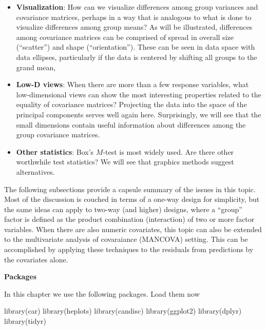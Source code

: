 \documentclass[
  letterpaper,
  10pt,
  krantz2]{krantz}
\makeatletter
\newenvironment{Shaded}{\begin{snugshade}}{\end{snugshade}}
\newcommand{\FunctionTok}[1]{\textcolor[rgb]{0.28,0.35,0.67}{#1}}
\newcommand{\NormalTok}[1]{\textcolor[rgb]{0.00,0.23,0.31}{#1}}
\newenvironment{kframe}{%
  \medskip{}
  \setlength{\fboxsep}{.8em}
  \def\at@end@of@kframe{}%
  \ifinner\ifhmode%
  \def\at@end@of@kframe{\end{minipage}}%
  \begin{minipage}{\columnwidth}%
  \fi\fi%
  \def\FrameCommand##1{\hskip\@totalleftmargin \hskip-\fboxsep
  \colorbox{shadecolor}{##1}\hskip-\fboxsep
      \hskip-\linewidth \hskip-\@totalleftmargin \hskip\columnwidth}%
  \MakeFramed {\advance\hsize-\width
    \@totalleftmargin\z@ \linewidth\hsize
    \@setminipage}}%
{\par\unskip\endMakeFramed%
  \at@end@of@kframe}
\renewenvironment{Shaded}{\begin{kframe}}{\end{kframe}}
\makeatother
\begin{document}
\begin{itemize}
\item
  \textbf{Visualization}: How can we visualize differences among group
  variances and covariance matrices, perhaps in a way that is analogous
  to what is done to visualize differences among group means? As will be
  illustrated, differences among covariance matrices can be comprised of
  spread in overall size (``scatter'') and shape (``orientation'').
  These can be seen in data space with data ellipses, particularly if
  the data is centered by shifting all groups to the grand mean,
\item
  \textbf{Low-D views}: When there are more than a few response
  variables, what low-dimensional views can show the most interesting
  properties related to the equality of covariance matrices? Projecting
  the data into the space of the principal components serves well again
  here. Surprisingly, we will see that the small dimensions contain
  useful information about differences among the group covariance
  matrices.
\item
  \textbf{Other statistics}: Box's \(M\)-test is most widely used. Are
  there other worthwhile test statistics? We will see that graphics
  methods suggest alternatives.
\end{itemize}

The following subsections provide a capsule summary of the issues in
this topic. Most of the discussion is couched in terms of a one-way
design for simplicity, but the same ideas can apply to two-way (and
higher) designs, where a ``group'' factor is defined as the product
combination (interaction) of two or more factor variables. When there
are also numeric covariates, this topic can also be extended to the
multivariate analysis of covaraiance (MANCOVA) setting. This can be
accomplished by applying these techniques to the residuals from
predictions by the covariates alone.

\textbf{Packages}

In this chapter we use the following packages. Load them now

\begin{Shaded}
\begin{Highlighting}[]
\FunctionTok{library}\NormalTok{(car)}
\FunctionTok{library}\NormalTok{(heplots)}
\FunctionTok{library}\NormalTok{(candisc)}
\FunctionTok{library}\NormalTok{(ggplot2)}
\FunctionTok{library}\NormalTok{(dplyr)}
\FunctionTok{library}\NormalTok{(tidyr)}
\end{Highlighting}
\end{Shaded}
\end{document}
